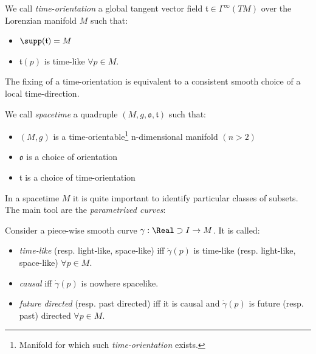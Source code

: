 \documentclass[Main]{subfiles}
\begin{document}
			\begin{definition}
				We call \emph{time-orientation} a global tangent vector field  $\mathfrak{t}\in \Gamma^\infty(TM)$ over the Lorenzian manifold $M$ 
				such that:
				\begin{itemize}
					\item $\supp(\mathfrak{t}) = M$
					\item $\mathfrak{t}(p)$ is time-like $\forall p \in M$.
				\end{itemize}
			\end{definition}
			\begin{observation}
				The fixing of a time-orientation is equivalent to a consistent smooth choice of a local time-direction.
			\end{observation}	
	
			\begin{definition}
				We call \emph{spacetime} a quadruple $(M, g, \mathfrak{o}, \mathfrak{t})$ such that:
				\begin{itemize}
					\item $(M,g)$ is a time-orientable\footnote{Manifold for which such \emph{time-orientation} exists.} n-dimensional manifold $(n>2)$
					\item $\mathfrak{o}$ is a choice of orientation
					\item $\mathfrak{t}$ is a choice of time-orientation
				\end{itemize}
			\end{definition}	
		
			In a spacetime $M$ it is quite important to identify particular classes of subsets. The main tool are the \emph{parametrized curves}:
			\begin{notationfix}
				Consider a piece-wise smooth curve $\gamma: \Real\supset I \rightarrow M$. It is called:
				\begin{itemize}
					\item \emph{time-like} (resp. light-like, space-like) iff $\dot{\gamma}(p)$ is time-like (resp. light-like, space-like) $\forall p \in M$.
					\item \emph{causal} iff $\dot{\gamma}(p)$ is nowhere spacelike.
					\item \emph{future directed} (resp. past directed) iff it is causal and  $\dot{\gamma}(p)$ is future (resp. past) directed $\forall p \in M$.
				\end{itemize}
			\end{notationfix}
\end{document}
